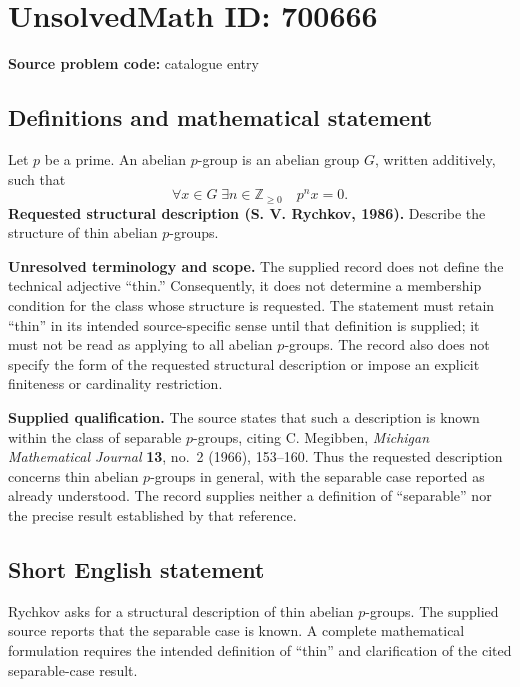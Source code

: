 \documentclass[11pt]{article}
\newcommand{\Z}{\mathbb{Z}}
\begin{document}
\section*{UnsolvedMath ID: 700666}
\textbf{Source problem code:} catalogue entry
\subsection{Definitions and mathematical statement}
Let \(p\) be a prime. An abelian \(p\)-group is an abelian group \(G\), written additively, such that
\[
\forall x\in G\;\exists n\in\Z_{\geq 0}\quad p^n x=0.
\]
\textbf{Requested structural description (S. V. Rychkov, 1986).} Describe the structure of thin abelian \(p\)-groups.

\textbf{Unresolved terminology and scope.} The supplied record does not define the technical adjective ``thin.'' Consequently, it does not determine a membership condition for the class whose structure is requested. The statement must retain ``thin'' in its intended source-specific sense until that definition is supplied; it must not be read as applying to all abelian \(p\)-groups. The record also does not specify the form of the requested structural description or impose an explicit finiteness or cardinality restriction.

\textbf{Supplied qualification.} The source states that such a description is known within the class of separable \(p\)-groups, citing C. Megibben, \emph{Michigan Mathematical Journal} \textbf{13}, no.~2 (1966), 153--160. Thus the requested description concerns thin abelian \(p\)-groups in general, with the separable case reported as already understood. The record supplies neither a definition of ``separable'' nor the precise result established by that reference.
\subsection{Short English statement}
Rychkov asks for a structural description of thin abelian \(p\)-groups. The supplied source reports that the separable case is known. A complete mathematical formulation requires the intended definition of ``thin'' and clarification of the cited separable-case result.
\end{document}
